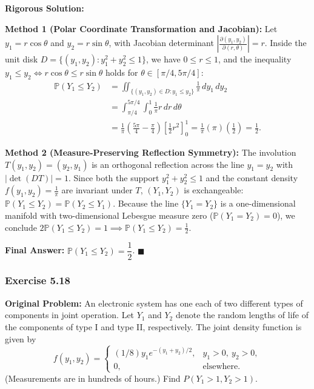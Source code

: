 \documentclass[11pt, letterpaper]{article}
\theoremstyle{definition}
\theoremstyle{remark}
\begin{document}
\textbf{Rigorous Solution:}

\textbf{Method 1 (Polar Coordinate Transformation and Jacobian):}
Let $y_1 = r\cos\theta$ and $y_2 = r\sin\theta$, with Jacobian determinant $\left|\frac{\partial(y_1, y_2)}{\partial(r, \theta)}\right| = r$. Inside the unit disk $D = \{(y_1, y_2) : y_1^2 + y_2^2 \le 1\}$, we have $0 \le r \le 1$, and the inequality $y_1 \le y_2 \iff r\cos\theta \le r\sin\theta$ holds for $\theta \in [\pi/4, 5\pi/4]$:
\begin{align*}
    \mathbb{P}(Y_1 \le Y_2) &= \iint_{\{(y_1, y_2) \in D : y_1 \le y_2\}} \frac{1}{\pi} \, dy_1 \, dy_2 \\
    &= \int_{\pi/4}^{5\pi/4} \int_{0}^{1} \frac{1}{\pi} r \, dr \, d\theta \\
    &= \frac{1}{\pi} \left( \frac{5\pi}{4} - \frac{\pi}{4} \right) \left[ \frac{1}{2} r^2 \right]_{0}^{1} = \frac{1}{\pi} (\pi) \left(\frac{1}{2}\right) = \frac{1}{2}.
\end{align*}

\textbf{Method 2 (Measure-Preserving Reflection Symmetry):}
The involution $T(y_1, y_2) = (y_2, y_1)$ is an orthogonal reflection across the line $y_1 = y_2$ with $|\det(DT)| = 1$. Since both the support $y_1^2 + y_2^2 \le 1$ and the constant density $f(y_1, y_2) = \frac{1}{\pi}$ are invariant under $T$, $(Y_1, Y_2)$ is exchangeable: $\mathbb{P}(Y_1 \le Y_2) = \mathbb{P}(Y_2 \le Y_1)$. Because the line $\{Y_1 = Y_2\}$ is a one-dimensional manifold with two-dimensional Lebesgue measure zero ($\mathbb{P}(Y_1 = Y_2) = 0$), we conclude $2\mathbb{P}(Y_1 \le Y_2) = 1 \implies \mathbb{P}(Y_1 \le Y_2) = \frac{1}{2}$.

\textbf{Final Answer:} $\mathbb{P}(Y_1 \le Y_2) = \dfrac{1}{2}$. $\blacksquare$

\bigskip

\subsubsection*{Exercise 5.18}
\textbf{Original Problem:} An electronic system has one each of two different types of components in joint operation. Let $Y_1$ and $Y_2$ denote the random lengths of life of the components of type I and type II, respectively. The joint density function is given by
\[
    f(y_1, y_2) = \begin{cases}
        (1/8) y_1 e^{-(y_1 + y_2)/2}, & y_1 > 0,\ y_2 > 0, \\
        0, & \text{elsewhere.}
    \end{cases}
\]
(Measurements are in hundreds of hours.) Find $P(Y_1 > 1, Y_2 > 1)$.
\end{document}
